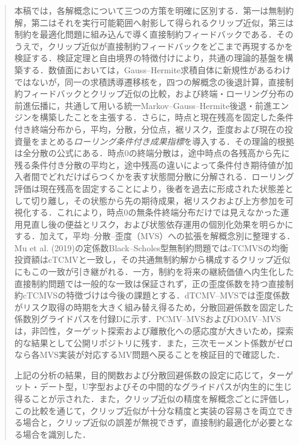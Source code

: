 \documentclass[10pt,a4paper]{article}
\theoremstyle{plain}
\theoremstyle{definition}
\begin{document}
\begin{abstract}
\begin{sloppypar}
本稿では，各解概念について三つの方策を明確に区別する．第一は無制約解，第二はそれを実行可能範囲へ射影して得られるクリップ近似，第三は制約を最適化問題に組み込んで導く直接制約フィードバックである．そのうえで，クリップ近似が直接制約フィードバックをどこまで再現するかを検証する．検証定理と自由境界の特徴付けにより，共通の理論的基盤を構築する．数値面においては，Gauss--Hermite求積自体に新規性があるわけではないが，同一の求積誘導遷移核を，四つの解概念の後退計算，直接制約フィードバックとクリップ近似の比較，および終端・ローリング分布の前進伝播に，共通して用いる統一Markov--Gauss--Hermite後退・前進エンジンを構築したことを主張する．さらに，時点と現在残高を固定した条件付き終端分布から，平均，分散，分位点，裾リスク，歪度および現在の投資量をまとめる\emph{ローリング条件付き成果指標}を導入する．その理論的根拠は全分散の公式にある．時点0の終端分散は，途中時点の各残高から先に残る条件付き分散の平均と，途中残高の違いによって条件付き期待値が加入者間でどれだけばらつくかを表す状態間分散に分解される．ローリング評価は現在残高を固定することにより，後者を過去に形成された状態差として切り離し，その状態から先の期待成果，裾リスクおよび上方参加を可視化する．これにより，時点0の無条件終端分布だけでは見えなかった運用見直し後の便益とリスク，および状態依存運用の個別化効果を明らかにする．加えて，平均--分散--歪度（MVS）への拡張を解概念別に整理する．Mu et al. (2019)の定係数Black--Scholes型無制約問題ではcTCMVSの均衡投資額はcTCMVと一致し，その共通無制約解から構成するクリップ近似にもこの一致が引き継がれる．一方，制約を将来の継続価値へ内生化した直接制約問題では一般的な一致は保証されず，正の歪度係数を持つ直接制約cTCMVSの特徴づけは今後の課題とする．dTCMV--MVSでは歪度係数がリスク取得の時期を大きく組み替え得るため，分散回避係数を固定した係数別グライドパスを付録Dに示す．PCMV--MVSおよびDOMV--MVSは，非凹性，ターゲット探索および離散化への感応度が大きいため，探索的な結果として公開リポジトリに残す．また，三次モーメント係数がゼロなら各MVS実装が対応するMV問題へ戻ることを検証目的で確認した．

上記の分析の結果，目的関数および分散回避係数の設定に応じて，ターゲット・デート型，U字型およびその中間的なグライドパスが内生的に生じ得ることが示された．また，クリップ近似の精度を解概念ごとに評価し，この比較を通じて，クリップ近似が十分な精度と実装の容易さを両立できる場合と，クリップ近似の誤差が無視できず，直接制約最適化が必要となる場合を識別した．


\end{sloppypar}
\end{abstract}
\end{document}
